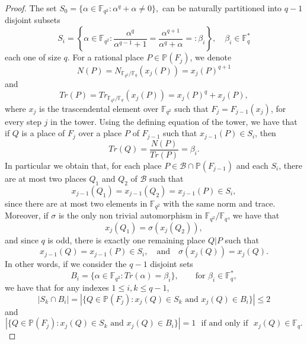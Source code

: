 \documentclass{amsart}
\newcommand{\F}{\mathbb{F}}
\renewcommand{\P}{\mathbb{P}}
\theoremstyle{definition}
\begin{document}
\begin{proof}

The set $ S_0=\{\alpha \in \F_{q^2}: \alpha^q+\alpha\neq 0\},$ can be naturally partitioned into $q-1$ disjoint subsets \begin{equation}\label{Si} S_i=\left\{ \alpha \in \F_{q^2}: \dfrac{\alpha^{q}}{\alpha^{q-1}+1} =\dfrac{\alpha^{q+1}}{\alpha^{q}+\alpha} =: \beta_i \right\}, \quad \beta_i \in \F_{q}^*\end{equation} each one of size  $q$. %
%
For a rational place $P \in \P(F_j)$, we denote $$N(P) = N_{\F_{q^2}/ \F_{q}}( x_j(P)) = x_j(P)^{q+1}$$ and $$Tr(P) = Tr_{\F_{q^2}/ \F_{q}}( x_j(P)) = x_j(P)^q + x_j(P),$$ where $x_j$ is the trascendental element over $\F_{q^2}$ such that $F_j= F_{j-1}(x_j)$, for every step $j$ in the tower.
Using the defining equation of the tower, we have that if $Q$ is a place of $F_j$  over a place $P$ of $F_{j-1}$ such that $x_{j-1}(P) \in S_i$, then $$Tr(Q) = \dfrac{N(P)}{Tr(P)}= \beta_i.$$ %
%
In particular we obtain that, for each place $P \in \mathcal{B}\cap \P(F_{j-1})$ and each $S_i$, there are at most two places $Q_1$ and $Q_2$ of $\mathcal{B}$ such that $$x_{j-1}(Q_1)=x_{j-1}(Q_2)=x_{j-1}(P) \in S_i,$$ since there are at most two elements in $\F_{q^2}$ with the same norm and trace. Moreover, if $\sigma$ is the only non trivial automorphism in $\F_{q^2}/\F_{q}$, we have that $$x_j(Q_1)=\sigma(x_j(Q_2)),$$ and since $q$ is odd, there is exactly one remaining place $Q|P$ such that $$x_{j-1}(Q)=x_{j-1}(P) \in S_i,\quad \text{and}\quad\sigma(x_j(Q))=x_j(Q).$$ In other words, if we consider the $q-1$ disjoint sets \begin{equation}\label{Bi} B_i=\{\alpha \in \F_{q^2}: Tr(\alpha) = \beta_i\}, \qquad \text{for } \beta_i \in \F_{q}^*,\end{equation} %
we have that
for any indexes $1\leq i,k \leq q-1$, \begin{equation}\label{equ1}
|S_k\cap B_i|=|\{Q\in \P(F_j):x_{j}(Q) \in S_k \text{ and }x_j(Q)\in B_i\}| \leq 2\end{equation} and \begin{equation}\label{equ2}|\{Q\in \P(F_j):x_{j}(Q) \in S_k \text{ and }x_j(Q)\in B_i\}| =1 \,\, \text{ if and only if }\,\, x_j(Q)\in \F_q.\end{equation}


\end{proof}
\end{document}
